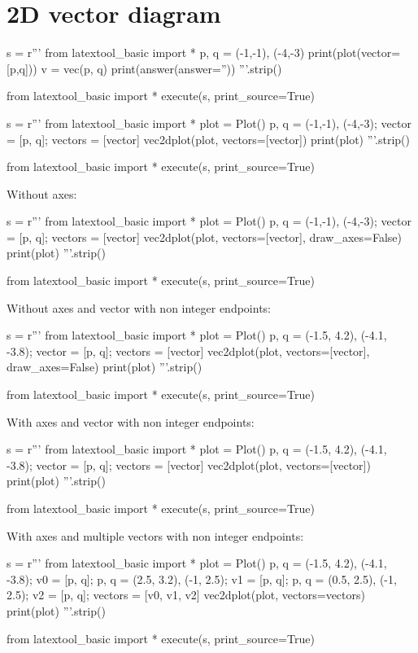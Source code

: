 \section{2D vector diagram}

\begin{python}
s = r'''
from latextool_basic import *
p, q = (-1,-1), (-4,-3)
print(plot(vector=[p,q]))
v = vec(p, q)
print(answer(answer=''))
'''.strip()

from latextool_basic import *
execute(s, print_source=True)
\end{python}

\begin{python}
s = r'''
from latextool_basic import *
plot = Plot()
p, q = (-1,-1), (-4,-3); vector = [p, q]; vectors = [vector]
vec2dplot(plot, vectors=[vector])
print(plot)
'''.strip()

from latextool_basic import *
execute(s, print_source=True)
\end{python}

Without axes:
\begin{python}
s = r'''
from latextool_basic import *
plot = Plot()
p, q = (-1,-1), (-4,-3); vector = [p, q]; vectors = [vector]
vec2dplot(plot, vectors=[vector], draw_axes=False)
print(plot)
'''.strip()

from latextool_basic import *
execute(s, print_source=True)
\end{python}

\newpage
Without axes and vector with non integer endpoints:
\begin{python}
s = r'''
from latextool_basic import *
plot = Plot()
p, q = (-1.5, 4.2), (-4.1, -3.8); vector = [p, q]; vectors = [vector]
vec2dplot(plot, vectors=[vector], draw_axes=False)
print(plot)
'''.strip()

from latextool_basic import *
execute(s, print_source=True)
\end{python}


\newpage
With axes and vector with non integer endpoints:
\begin{python}
s = r'''
from latextool_basic import *
plot = Plot()
p, q = (-1.5, 4.2), (-4.1, -3.8); vector = [p, q]; vectors = [vector]
vec2dplot(plot, vectors=[vector])
print(plot)
'''.strip()

from latextool_basic import *
execute(s, print_source=True)
\end{python}


\newpage
With axes and multiple vectors with non integer endpoints:
\begin{python}
s = r'''
from latextool_basic import *
plot = Plot()
p, q = (-1.5, 4.2), (-4.1, -3.8); v0 = [p, q];
p, q = (2.5, 3.2), (-1, 2.5); v1 = [p, q];
p, q = (0.5, 2.5), (-1, 2.5); v2 = [p, q];
vectors = [v0, v1, v2]
vec2dplot(plot, vectors=vectors)
print(plot)
'''.strip()

from latextool_basic import *
execute(s, print_source=True)
\end{python}

